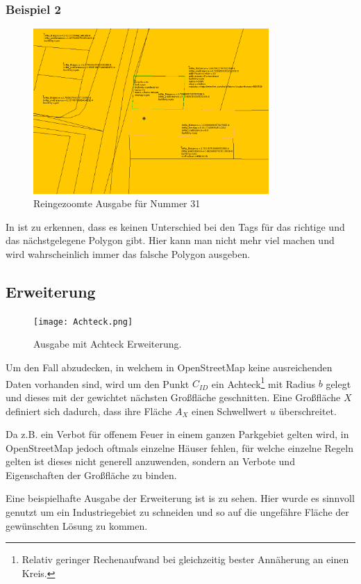 \subsubsection{Beispiel 2}
\begin{figure}
 \centering
 \includegraphics[width=0.8\textwidth]{DataFailZoom.png}
 \caption{Reingezoomte Ausgabe für Nummer 31}
 \label{fig:DataFailZoom}
\end{figure}
In  ist zu erkennen, dass es keinen Unterschied bei den Tags für das richtige und das nächstgelegene Polygon gibt.
Hier kann man nicht mehr viel machen und wird wahrscheinlich immer das falsche Polygon ausgeben.


\subsection{Erweiterung}
\begin{figure}
 \centering
 \texttt{[image: Achteck.png]}
 \caption{Ausgabe mit Achteck Erweiterung.}
 \label{fig:DataEight}
\end{figure}
Um den Fall abzudecken, in welchem in OpenStreetMap keine ausreichenden Daten vorhanden sind, wird um den Punkt $C_{ID}$ ein
Achteck\footnote{Relativ geringer Rechenaufwand bei gleichzeitig bester Annäherung an einen Kreis.} mit Radius $b$ gelegt
und dieses mit der gewichtet nächsten Großfläche geschnitten.
Eine Großfläche $X$ definiert sich dadurch, dass ihre Fläche $A_X$ einen Schwellwert $u$ überschreitet.

Da z.B. ein Verbot für offenem Feuer in einem ganzen Parkgebiet gelten wird, in OpenStreetMap
jedoch oftmals einzelne Häuser fehlen, für welche einzelne Regeln gelten ist dieses nicht generell anzuwenden,
sondern an Verbote und Eigenschaften der Großfläche zu binden.

Eine beispielhafte Ausgabe der Erweiterung ist is  zu sehen.
Hier wurde es sinnvoll genutzt um ein Industriegebiet zu schneiden und so auf die ungefähre
Fläche der gewünschten Lösung zu kommen.
